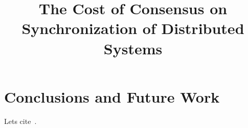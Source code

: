\documentclass[10pt, conference]{IEEEtran}
\title{The Cost of Consensus on Synchronization of Distributed Systems}
\begin{document}
\maketitle

\begin{abstract}

\end{abstract}

\begin{keywords}
\end{keywords}









\section{Conclusions and Future Work}\label{sec:conclusions}
Lets cite~\cite{Cooper:2008:PYH:1454159.1454167}.







\end{document}
